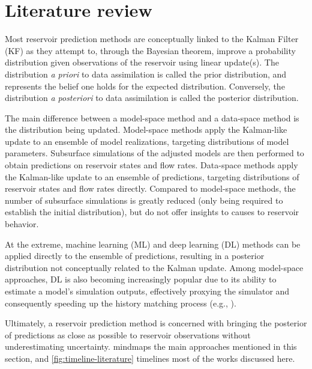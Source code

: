\chapter{Literature review}
\label{chap:literature-review}


Most reservoir prediction methods are conceptually linked to the Kalman Filter (KF)
\cite{Kalman:1960} 
as they attempt to, through the Bayesian theorem, improve a probability distribution given observations of the reservoir
using linear update(s). 
%
The distribution \emph{a priori} to data assimilation is called the prior distribution,
and represents the belief one holds for the expected distribution.
Conversely, the distribution \emph{a posteriori} to data assimilation is called the posterior distribution.

The main difference between a model-space method and a data-space method is the distribution being updated.
Model-space methods apply the Kalman-like update to an ensemble of model realizations, targeting distributions of model parameters.
Subsurface simulations of the adjusted models are then performed to obtain predictions on reservoir states and flow rates.
% 
Data-space methods apply the Kalman-like update to an ensemble of predictions, targeting distributions of reservoir states and flow rates directly.
Compared to model-space methods, the number of subsurface simulations is greatly reduced (only being required to establish the initial distribution),
but do not offer insights to causes to reservoir behavior.

At the extreme, machine learning (ML) and deep learning (DL) methods can be applied directly to the ensemble of predictions,
resulting in a posterior distribution not conceptually related to the Kalman update.
%
Among model-space approaches, DL is also becoming increasingly popular due to its ability to estimate a model's simulation outputs,
effectively proxying the simulator and consequently speeding up the history matching process
(e.g., ).

Ultimately, a reservoir prediction method is concerned with bringing the posterior of predictions 
as close as possible to reservoir observations without underestimating uncertainty.
%
 mindmaps the main approaches mentioned in this section, and
\cref{fig:timeline-literature} timelines most of the works discussed here.

